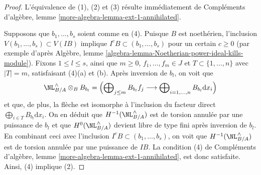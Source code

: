 \begin{proof}
L'équivalence de (1), (2) et (3) résulte immédiatement de Compléments
d'algèbre, lemme \ref{more-algebra-lemma-ext-1-annihilated}.

\medskip\noindent
Supposons que $b_1, \ldots, b_s$ soient comme en (4). Puisque $B$ est
noethérien, l'inclusion $V(b_1, \ldots, b_s) \subset V(IB)$ implique
$I^cB \subset (b_1, \ldots, b_s)$ pour un certain $c \geq 0$ (par exemple
d'après Algèbre, lemme
\ref{algebra-lemma-Noetherian-power-ideal-kills-module}). Fixons
$1 \leq l \leq s$, ainsi que $m \geq 0$, $f_1, \ldots, f_m \in J$ et
$T \subset \{1, \ldots, n\}$ avec $|T| = m$, satisfaisant (4)(a) et (b).
Après inversion de $b_l$, on voit que
$$
\NL_{B/A}^\wedge \otimes_B B_{b_l} =
\left(
\bigoplus\nolimits_{j \leq m} B_{b_l} f_j
\longrightarrow
\bigoplus\nolimits_{i = 1, \ldots, n} B_{b_l} \text{d}x_i
\right)
$$
et que, de plus, la flèche est isomorphe à l'inclusion du facteur direct
$\bigoplus_{i \in T} B_{b_l} \text{d}x_i$. On en déduit que
$H^{-1}(\NL_{B/A}^\wedge)$ est de torsion annulée par une puissance de $b_l$
et que $H^0(\NL_{B/A}^\wedge)$ devient libre de type fini après inversion de
$b_l$. En combinant ceci avec l'inclusion
$I^cB \subset (b_1, \ldots, b_s)$, on voit que
$H^{-1}(\NL_{B/A}^\wedge)$ est de torsion annulée par une puissance de $IB$.
La condition (4) de Compléments d'algèbre, lemme
\ref{more-algebra-lemma-ext-1-annihilated}, est donc satisfaite. Ainsi, (4)
implique (2).


\end{proof}
